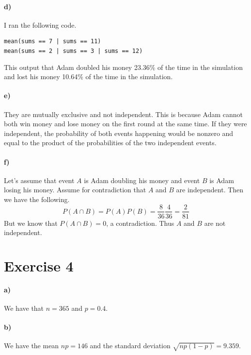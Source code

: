 \documentclass[12pt]{article}
\begin{document}
\paragraph{d)}

I ran the following code.
\begin{verbatim}
mean(sums == 7 | sums == 11)
mean(sums == 2 | sums == 3 | sums == 12)
\end{verbatim}
This output that Adam doubled his money 23.36\% of the time in the simulation and lost
his money 10.64\% of the time in the simulation.

\paragraph{e)}

They are mutually exclusive and not independent. This is because Adam cannot
both win money and lose money on the first round at the same time. If they
were independent, the probability of both events happening would be nonzero and
equal to the product of the probabilities of the two independent events.

\paragraph{f)}

Let's assume that event \(A\) is Adam doubling his money and event \(B\) is
Adam losing his money. Assume for contradiction that \(A\) and \(B\) are independent.
Then we have the following.
\[P(A\cap B)=P(A)P(B)=\frac{8}{36}\frac{4}{36}=\frac{2}{81}\]
But we know that \(P(A\cap B)=0\), a contradiction. Thus \(A\) and \(B\) are not
independent.

\section*{Exercise 4}

\paragraph{a)}

We have that \(n=365\) and \(p=0.4\).

\paragraph{b)}

We have the mean \(np=146\) and the standard deviation \(\sqrt{np(1-p)}=9.359\).
\end{document}
